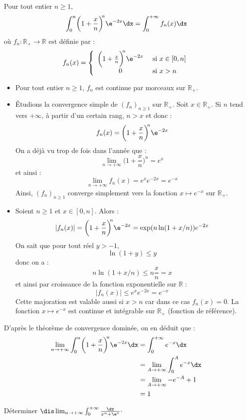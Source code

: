 \documentclass[a4paper,10pt]{report}
\begin{document}
\corr Pour tout entier $n \geq 1$,
$$ \int_{0}^{n} \biggl( 1 + \frac{x}{n} \biggr)^{\!\!n} \e^{ - 2x} \dx = \int_0^{+ \infty} f_n(x) \dx$$
où $f_n : \mathbb{R}_+ \rightarrow  \mathbb{R}$ est définie par :
$$ f_n(x) = \left\lbrace \begin{array}{cl}
\biggl( 1 + \frac{x}{n} \biggr)^{\!\!n} \e^{ - 2x} & \hbox{ si } x \in [0,n] \\
0 & \hbox{ si } x>n
\end{array}\right.$$
\begin{itemize}
\item Pour tout entier $n \geq 1$, $f_n$ est continue par morceaux sur $\mathbb{R}_+$.
\item Étudions la convergence simple de $(f_n)_{n \geq 1}$ sur $\mathbb{R}_+$. Soit $x \in \mathbb{R}_+$. Si $n$ tend vers $+ \infty$, à partir d'un certain rang, $n>x$ et donc :
$$ f_n(x) = \biggl( 1 + \frac{x}{n} \biggr)^{\!\!n} \e^{ - 2x}$$
On a déjà vu trop de fois dans l'année que :
$$ \lim_{n \rightarrow + \infty} \biggl( 1 + \frac{x}{n} \biggr)^{\!\!n} = e^x$$
et ainsi :
$$ \lim_{n \rightarrow + \infty} f_n(x) =e^x e^{-2x} = e^{-x}$$
Ainsi, $(f_n)_{n \geq 1}$ converge simplement vers la fonction $x \mapsto e^{-x}$ sur $\mathbb{R}_+$.
\item Soient $n \geq 1$ et $x \in [0,n]$. Alors :
$$ \vert f_n(x) \vert = \biggl( 1 + \frac{x}{n} \biggr)^{\!\!n} \e^{ - 2x} = \exp(n \ln(1+x/n)) e^{-2x}$$
On sait que pour tout réel $y>-1$,
$$ \ln(1+y) \leq y$$
donc on a :
$$ n \ln(1+x/n) \leq n\dfrac{x}{n} = x$$
et ainsi par croissance de la fonction exponentielle sur $\mathbb{R}$ :
$$ \vert f_n(x) \vert  \leq e^{x} e^{-2x} = e^{-x}$$
Cette majoration est valable aussi si $x>n$ car dans ce cas $f_n(x)=0$. La fonction $x \mapsto e^{-x}$ est continue et intégrable sur $\mathbb{R}_+$ (fonction de référence).
\end{itemize}
D'après le théorème de convergence dominée, on en déduit que :
\begin{align*}
\lim_{n \to + \infty} \int_{0}^{n} \biggl( 1 + \frac{x}{n} \biggr)^{\!\!n} \e^{ - 2x} \dx & = \int_0^{+ \infty} e^{-x} \dx \\
& = \lim_{A \rightarrow + \infty} \int_0^A e^{-x} \dx \\
&  = \lim_{A \rightarrow + \infty} -e^{-A}+1 \\
& = 1
\end{align*}


 \begin{Exercice}{} Déterminer $\dis \lim_{n \rightarrow + \infty} \int_{0}^{ + \infty} \frac{\dx}{x^{n} + \e^{x}} \cdot$
 \end{Exercice}
 
\end{document}
